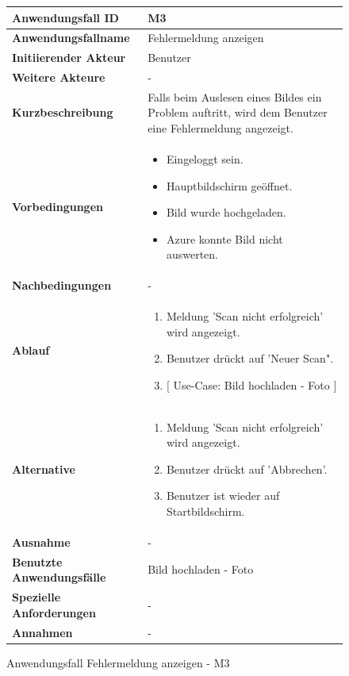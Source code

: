 \begin{figure}[H]
	\centering
	\begin{tabularx}{\textwidth}{ X | X }
		\textbf{Anwendungsfall ID} & M3 \\ \hline
		\textbf{Anwendungsfallname} & Fehlermeldung anzeigen \\ \hline
		\textbf{Initiierender Akteur} & Benutzer \\ \hline
		\textbf{Weitere Akteure} & - \\ \hline
		\textbf{Kurzbeschreibung} & Falls beim Auslesen eines Bildes ein Problem auftritt, wird dem Benutzer eine Fehlermeldung angezeigt.   \\ \hline
		\textbf{Vorbedingungen} & 
		\begin {itemize}
			\item Eingeloggt sein. 
			\item Hauptbildschirm geöffnet.
			\item Bild wurde hochgeladen.
			\item Azure konnte Bild nicht auswerten.
		\end{itemize}\\ \hline
		\textbf{Nachbedingungen} & - \\ \hline
		\textbf{Ablauf} &
		\begin{enumerate}
			\item Meldung 'Scan nicht erfolgreich' wird angezeigt.
			\item Benutzer drückt auf 'Neuer Scan".
			\item $\lbrack$ Use-Case: Bild hochladen - Foto $\rbrack$
		\end{enumerate} \\ \hline
		\textbf{Alternative} & 
		\begin{enumerate}
			\item Meldung 'Scan nicht erfolgreich' wird angezeigt.
			\item Benutzer drückt auf 'Abbrechen'.
			\item Benutzer ist wieder auf Startbildschirm.
		\end{enumerate} \\ \hline
		\textbf{Ausnahme} & -   \\ \hline
		\textbf{Benutzte Anwendungsfälle} & Bild hochladen - Foto \\ \hline
		\textbf{Spezielle Anforderungen} & - \\ \hline
		\textbf{Annahmen} & -
	\end{tabularx}
	\caption{Anwendungsfall Fehlermeldung anzeigen - M3}
	\label{fig:anwendungsfall-server-tabelle-xx-1}
\end{figure}


